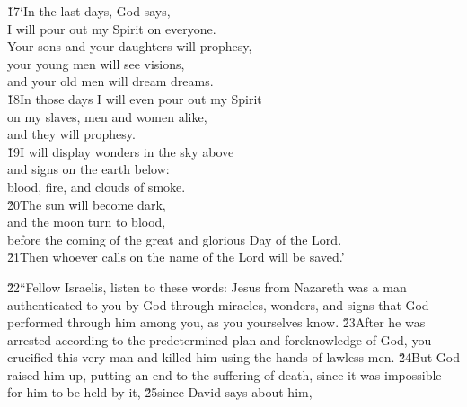 \begin{poetry}
\poeml \v{17}`In the last days, God says, \\
\poemll    I will pour out my Spirit on everyone. \\
\poeml Your sons and your daughters will prophesy, \\
\poemll    your young men will see visions, \\
\poemlll       and your old men will dream dreams. \\
\poeml \v{18}In those days I will even pour out my Spirit \\
\poemll    on my slaves, men and women alike, \\
\poemlll       and they will prophesy. \\
\poeml \v{19}I will display wonders in the sky above \\
\poemll    and signs on the earth below: \\
\poemlll       blood, fire, and clouds of smoke. \\
\poeml \v{20}The sun will become dark, \\
\poemll    and the moon turn to blood, \\
\poemlll       before the coming of the great and glorious Day of the Lord. \\
\poeml \v{21}Then whoever calls on the name of the Lord will be saved.'
\end{poetry}

\v{22}``Fellow Israelis, listen to these words: Jesus from Nazareth was a man authenticated to you by God through miracles, wonders, and signs that God performed through him among you, as you yourselves know. \v{23}After he was arrested according to the predetermined plan and foreknowledge of God, you crucified this very man and killed him using the hands of lawless men. \v{24}But God raised him up, putting an end to the suffering of death, since it was impossible for him to be held by it, \v{25}since David says about him,

